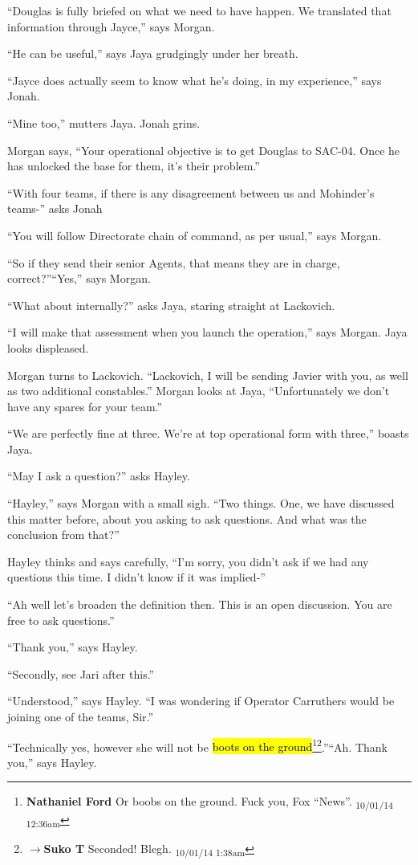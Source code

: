 ``Douglas is fully briefed on what we need to have happen.  We translated that information through Jayce,'' says Morgan.

``He can be useful,'' says Jaya grudgingly under her breath.

``Jayce does actually seem to know what he's doing, in my experience,'' says Jonah.

``Mine too,'' mutters Jaya.  Jonah grins.

Morgan says, ``Your operational objective is to get Douglas to SAC-04.  Once he has unlocked the base for them, it's their problem.''

``With four teams, if there is any disagreement between us and Mohinder's teams-'' asks Jonah

``You will follow Directorate chain of command, as per usual,'' says Morgan.

``So if they send their senior Agents, that means they are in charge, correct?''``Yes,'' says Morgan.

``What about internally?'' asks Jaya, staring straight at Lackovich.

``I will make that assessment when you launch the operation,'' says Morgan.  Jaya looks displeased.

Morgan turns to Lackovich.  ``Lackovich, I will be sending Javier with you, as well as two additional constables.''  Morgan looks at Jaya, ``Unfortunately we don't have any spares for your team.''

``We are perfectly fine at three. We're at top operational form with three,'' boasts Jaya.

``May I ask a question?'' asks Hayley.

``Hayley,'' says Morgan with a small sigh.  ``Two things.  One, we have discussed this matter before, about you asking to ask questions.  And what was the conclusion from that?''

Hayley thinks and says carefully, ``I'm sorry, you didn't ask if we had any questions this time.  I didn't know if it was implied-''

``Ah well let's broaden the definition then. This is an open discussion.  You are free to ask questions.''

``Thank you,'' says Hayley.

``Secondly, see Jari after this.''

``Understood,'' says Hayley.  ``I was wondering if Operator Carruthers would be joining one of the teams, Sir.''

``Technically yes, however she will not be \hl{boots on the ground}\footnote{\textbf{Nathaniel Ford }Or boobs on the ground. Fuck you, Fox ``News''. \textsubscript{10/01/14 12:36am}}\footnote{$\rightarrow$\textbf{Suko T }Seconded!  Blegh. \textsubscript{10/01/14 1:38am}}.''``Ah.  Thank you,'' says Hayley.

